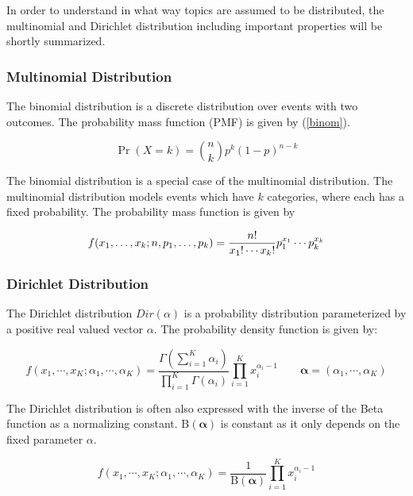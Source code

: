 \documentclass[a4paper,ngerman]{atseminar}
\begin{document}
In order to understand in what way topics are assumed to be distributed, the multinomial
and Dirichlet distribution including important properties will be shortly summarized.

\subsubsection{Multinomial Distribution}

The binomial distribution is a discrete distribution over events with two outcomes.
The probability mass function (PMF) is given by (\ref{binom}).

\begin{equation} \label{binom}
\Pr(X = k) = \binom n k  p^k(1-p)^{n-k}
\end{equation}

The binomial distribution is a special case of the multinomial distribution.
The multinomial distribution models events which have $k$ categories, 
where each has a fixed probability. The probability mass function is given by 

\begin{equation}
f(x_1,\ldots,x_k;n,p_1,\ldots,p_k) = { \displaystyle {n! \over x_1!\cdots x_k!}p_1^{x_1}\cdots p_k^{x_k}}
\end{equation}


\subsubsection{Dirichlet Distribution}
The Dirichlet distribution $Dir(\alpha)$ is a probability distribution parameterized by a positive real valued vector $\alpha$.
The probability density function is given by:

\begin{equation}
f \left(x_1,\cdots, x_{K}; \alpha_1,\cdots, \alpha_K \right) = \frac{\Gamma\left(\sum_{i=1}^K \alpha_i\right)}{\prod_{i=1}^K \Gamma(\alpha_i)} \prod_{i=1}^K x_i^{\alpha_i - 1}       \qquad\boldsymbol{\alpha}=(\alpha_1,\cdots,\alpha_K) 
\end{equation}

The Dirichlet distribution is often also expressed with the inverse of the Beta function as a normalizing constant.
${\mathrm{B}(\boldsymbol\alpha)}$ is constant as it only depends on the fixed parameter $\alpha$.

\begin{equation}
f \left(x_1,\cdots, x_{K}; \alpha_1,\cdots, \alpha_K \right) = \frac{1}{\mathrm{B}(\boldsymbol\alpha)} \prod_{i=1}^K x_i^{\alpha_i - 1}
\end{equation}
\end{document}
